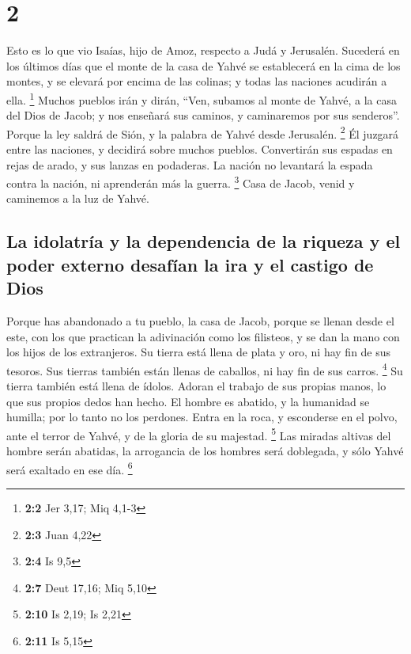 \hypertarget{section-1}{%
\section{2}\label{section-1}}

 Esto es lo que vio Isaías, hijo de Amoz, respecto a Judá
y Jerusalén.  Sucederá en los últimos días que el monte de
la casa de Yahvé se establecerá en la cima de los montes, y se elevará
por encima de las colinas; y todas las naciones acudirán a ella.
\footnote{\textbf{2:2} Jer 3,17; Miq 4,1-3}  Muchos
pueblos irán y dirán, ``Ven, subamos al monte de Yahvé, a la casa del
Dios de Jacob; y nos enseñará sus caminos, y caminaremos por sus
senderos''. Porque la ley saldrá de Sión, y la palabra de Yahvé desde
Jerusalén. \footnote{\textbf{2:3} Juan 4,22}  Él juzgará
entre las naciones, y decidirá sobre muchos pueblos. Convertirán sus
espadas en rejas de arado, y sus lanzas en podaderas. La nación no
levantará la espada contra la nación, ni aprenderán más la guerra.
\footnote{\textbf{2:4} Is 9,5}  Casa de Jacob, venid y
caminemos a la luz de Yahvé.

\hypertarget{la-idolatruxeda-y-la-dependencia-de-la-riqueza-y-el-poder-externo-desafuxedan-la-ira-y-el-castigo-de-dios}{%
\subsection{La idolatría y la dependencia de la riqueza y el poder
externo desafían la ira y el castigo de
Dios}\label{la-idolatruxeda-y-la-dependencia-de-la-riqueza-y-el-poder-externo-desafuxedan-la-ira-y-el-castigo-de-dios}}

 Porque has abandonado a tu pueblo, la casa de Jacob,
porque se llenan desde el este, con los que practican la adivinación
como los filisteos, y se dan la mano con los hijos de los extranjeros.
 Su tierra está llena de plata y oro, ni hay fin de sus
tesoros. Sus tierras también están llenas de caballos, ni hay fin de sus
carros. \footnote{\textbf{2:7} Deut 17,16; Miq 5,10}  Su
tierra también está llena de ídolos. Adoran el trabajo de sus propias
manos, lo que sus propios dedos han hecho.  El hombre es
abatido, y la humanidad se humilla; por lo tanto no los perdones.
 Entra en la roca, y esconderse en el polvo, ante el
terror de Yahvé, y de la gloria de su majestad. \footnote{\textbf{2:10}
  Is 2,19; Is 2,21}  Las miradas altivas del hombre serán
abatidas, la arrogancia de los hombres será doblegada, y sólo Yahvé será
exaltado en ese día. \footnote{\textbf{2:11} Is 5,15}


